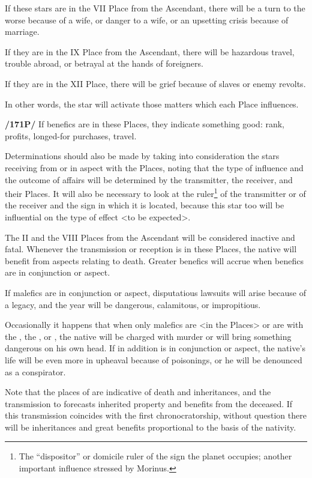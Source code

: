 If these stars are in the VII Place from the Ascendant, there will be a turn to the worse because of a wife, or danger to a wife, or an upsetting crisis because of marriage. 

If they are in the IX Place from the Ascendant, there will be hazardous travel, trouble abroad, or betrayal at the hands of foreigners. 

If they are in the XII Place, there will be grief because
of slaves or enemy revolts. 

In other words, the star will activate those matters which each Place influences.

\textbf{/171P/} If benefics are in these Places, they indicate something good: rank, profits, longed-for purchases, travel.

Determinations should also be made by taking into consideration the stars receiving from or in aspect with the Places, noting that the type of influence and the outcome of affairs will be determined by the transmitter, the receiver, and their Places.
It will also be necessary to look at the ruler\footnote{The ``dispositor'' or domicile ruler of the sign the planet occupies; another important influence stressed by Morinus.} of the transmitter or of the receiver and the sign in which it is located, because this star too will be influential on the type of effect <to be expected>. 

The II and the VIII Places from the Ascendant will be considered inactive and fatal. Whenever the transmission or
reception is in these Places, the native will benefit from aspects relating to death. Greater benefics will accrue when benefics are in conjunction or aspect. 

If malefics are in conjunction or aspect, disputatious lawsuits will arise because of a legacy, and the year will be dangerous, calamitous, or impropitious.

Occasionally it happens that when only malefics are <in the Places> or are with the \Sun, the \Moon, or \Mercury, the native will be charged with murder or will bring something dangerous on his own head. If in addition \Venus\xspace is in conjunction or aspect, the native’s life will be even more in upheaval because of poisonings, or he will be denounced as a conspirator. 

Note that the places of \Saturn\xspace are indicative of death and inheritances, and the transmission to \Jupiter\xspace forecasts inherited property and benefits from the deceased.
If this transmission coincides with the first chronocratorship, without question there will be inheritances and great benefits proportional to the basis of the nativity. 

